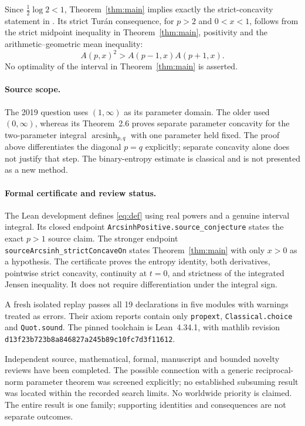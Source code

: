 \documentclass[11pt]{article}
\begin{document}
Since $\tfrac12\log2<1$, Theorem~\ref{thm:main} implies exactly the
strict-concavity statement in \cite[Conjecture~5.1]{YHWL}. Its strict
Tur\'an consequence, for $p>2$ and $0<x<1$, follows from the strict
midpoint inequality in Theorem~\ref{thm:main}, positivity and the
arithmetic--geometric mean inequality:
\[
 A(p,x)^2>A(p-1,x)A(p+1,x).
\]
No optimality of the interval in Theorem~\ref{thm:main} is asserted.

\paragraph{Source scope.}
The 2019 question uses $(1,\infty)$ as its parameter domain.
The older \cite[Conjecture~2.4]{BBV} used $(0,\infty)$, whereas its
Theorem~2.6 proves separate parameter concavity for the two-parameter
integral $\operatorname{arcsinh}_{p,q}$ with one parameter held fixed.
The proof above differentiates the diagonal $p=q$ explicitly; separate
concavity alone does not justify that step. The binary-entropy estimate
is classical and is not presented as a new method.

\paragraph{Formal certificate and review status.}
The Lean development defines \eqref{eq:def} using real powers and a genuine
interval integral. Its closed endpoint
\texttt{ArcsinhPositive.source\_conjecture} states the exact $p>1$ source
claim. The stronger endpoint
\texttt{sourceArcsinh\_strictConcaveOn} states Theorem~\ref{thm:main} with
only $x>0$ as a hypothesis. The certificate proves the entropy identity,
both derivatives, pointwise strict concavity, continuity at $t=0$, and
strictness of the integrated Jensen inequality. It does not require
differentiation under the integral sign.

A fresh isolated replay passes all 19 declarations in five modules with
warnings treated as errors. Their axiom reports contain only
\texttt{propext}, \texttt{Classical.choice} and \texttt{Quot.sound}.
The pinned toolchain is Lean~4.34.1, with mathlib revision\\
\texttt{d13f23b723b8a846827a245b89c10fc7d3f11612}.

Independent source, mathematical, formal, manuscript and bounded
novelty reviews have been completed. The possible connection with a generic
reciprocal-norm parameter theorem was screened explicitly; no established
subsuming result was located within the recorded search limits. No
worldwide priority is claimed. The entire result is one family; supporting
identities and consequences are not separate outcomes.
\end{document}
